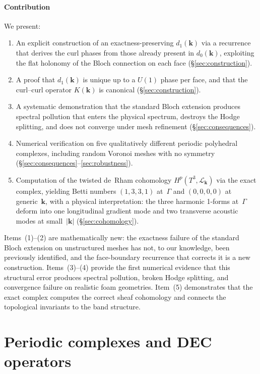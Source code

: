\documentclass[preprint,12pt]{elsarticle}
\begin{document}
\paragraph{Contribution} We present:
\begin{enumerate}
  \item An explicit construction of an exactness-preserving $d_1(\mathbf{k})$ via a recurrence that derives the curl phases from those already present in $d_0(\mathbf{k})$, exploiting the flat holonomy of the Bloch connection on each face (\S\ref{sec:construction}).
  \item A proof that $d_1(\mathbf{k})$ is unique up to a $U(1)$ phase per face, and that the curl--curl operator $K(\mathbf{k})$ is canonical (\S\ref{sec:construction}).
  \item A systematic demonstration that the standard Bloch extension produces spectral pollution that enters the physical spectrum, destroys the Hodge splitting, and does not converge under mesh refinement (\S\ref{sec:consequences}).
  \item Numerical verification on five qualitatively different periodic polyhedral complexes, including random Voronoi meshes with no symmetry (\S\ref{sec:consequences}--\ref{sec:robustness}).
  \item Computation of the twisted de~Rham cohomology $H^p(T^3, \mathcal{L}_\mathbf{k})$ via the exact complex, yielding Betti numbers $(1,3,3,1)$ at~$\Gamma$ and $(0,0,0,0)$ at generic~$\mathbf{k}$, with a physical interpretation: the three harmonic 1-forms at~$\Gamma$ deform into one longitudinal gradient mode and two transverse acoustic modes at small~$|\mathbf{k}|$ (\S\ref{sec:cohomology}).
\end{enumerate}
Items~(1)--(2) are mathematically new: the exactness failure of the standard Bloch extension on unstructured meshes has not, to our knowledge, been previously identified, and the face-boundary recurrence that corrects it is a new construction. Items~(3)--(4) provide the first numerical evidence that this structural error produces spectral pollution, broken Hodge splitting, and convergence failure on realistic foam geometries. Item~(5) demonstrates that the exact complex computes the correct sheaf cohomology and connects the topological invariants to the band structure.

\section{Periodic complexes and DEC operators}
\label{sec:setup}
\end{document}

